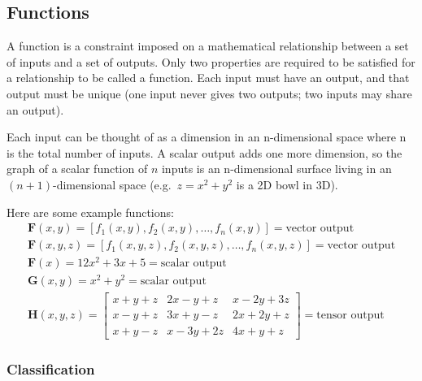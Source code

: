 \subsection{Functions}

A function is a constraint imposed on a mathematical relationship between
a set of inputs and a set of outputs. Only two properties
are required to be satisfied for a relationship to be called a function. Each
input must have an output, and that output must be unique (one input never
gives two outputs; two inputs may share an output).

Each input can be thought of as a dimension in an n-dimensional space where
n is the total number of inputs. A scalar output adds one more dimension, so
the graph of a scalar function of \(n\) inputs is an n-dimensional surface
living in an \((n + 1)\)-dimensional space (e.g.\ \(z = x^2 + y^2\) is a 2D bowl in
3D).

Here are some example functions:
\begin{align*}
  \mathbf{F}(x, y) = [f_1(x, y), f_2(x, y), \ldots, f_n(x, y)] = \text{vector output} \\
  \mathbf{F}(x, y, z) = [f_1(x, y, z), f_2(x, y, z), \ldots, f_n(x, y, z)] = \text{vector output} \\
  \mathbf{F}(x) =  12x^2 + 3x + 5 = \text{scalar output} \\
  \mathbf{G}(x, y) = x^2 + y^2 = \text{scalar output} \\
  \mathbf{H}(x, y, z) = \begin{bmatrix}
    x + y + z & 2x - y + z & x - 2y + 3z \\
    x - y + z & 3x + y - z & 2x + 2y + z \\
    x + y - z & x - 3y + 2z & 4x + y + z
  \end{bmatrix} = \text{tensor output}
\end{align*}

\subsubsection{Classification}

